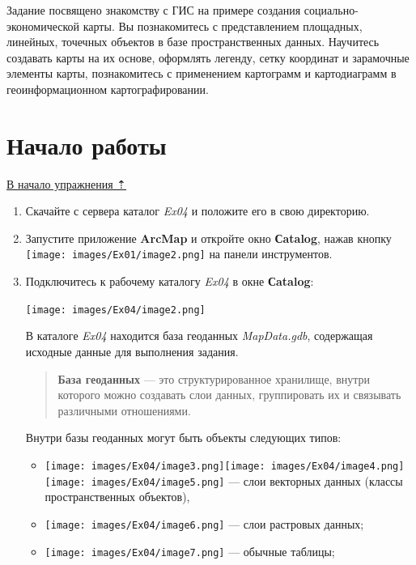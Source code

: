 \documentclass[12pt,]{book}
\providecommand{\tightlist}{%
  \setlength{\itemsep}{0pt}\setlength{\parskip}{0pt}}
\begin{document}
Задание посвящено знакомству с ГИС на примере создания социально-экономической карты. Вы познакомитесь с представлением площадных, линейных, точечных объектов в базе пространственных данных. Научитесь создавать карты на их основе, оформлять легенду, сетку координат и зарамочные элементы карты, познакомитесь с применением картограмм и картодиаграмм в геоинформационном картографировании.

\hypertarget{map-design-economic-begin}{%
\section{Начало работы}\label{map-design-economic-begin}}

\protect\hyperlink{map-design-economic}{В начало упражнения ⇡}

\begin{enumerate}
\def\labelenumi{\arabic{enumi}.}
\item
  Скачайте с сервера каталог \emph{Ex04} и положите его в свою директорию.
\item
  Запустите приложение \textbf{ArcMap} и откройте окно \textbf{Сatalog}, нажав кнопку \texttt{[image: images/Ex01/image2.png]} на панели инструментов.
\item
  Подключитесь к рабочему каталогу \emph{Ex04} в окне \textbf{Сatalog}:

  \texttt{[image: images/Ex04/image2.png]}

  В каталоге \emph{Ex04} находится база геоданных \emph{MapData.gdb}, содержащая исходные данные для выполнения задания.

  \begin{quote}
  \textbf{База геоданных} --- это структурированное хранилище, внутри которого можно создавать слои данных, группировать их и связывать различными отношениями.
  \end{quote}

  Внутри базы геоданных могут быть объекты следующих типов:

  \begin{itemize}
  \tightlist
  \item
    \texttt{[image: images/Ex04/image3.png]}\texttt{[image: images/Ex04/image4.png]}\texttt{[image: images/Ex04/image5.png]} --- слои векторных данных (классы пространственных объектов),
  \item
    \texttt{[image: images/Ex04/image6.png]} --- слои растровых данных;
  \item
    \texttt{[image: images/Ex04/image7.png]} --- обычные таблицы;
  \end{itemize}


\end{enumerate}
\end{document}
